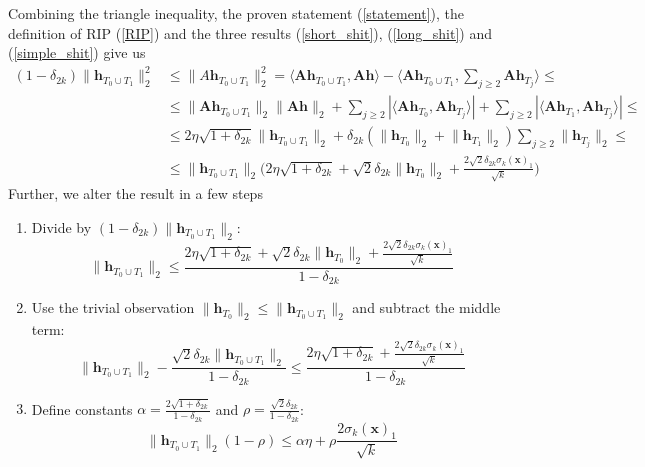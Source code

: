 \documentclass[11pt,oneside,czech,american]{book} %
\theoremstyle{definition} %
\theoremstyle{definition}
\begin{document}
Combining the triangle inequality, the proven statement (\ref{statement}), the definition of RIP (\ref{RIP}) and the three results (\ref{short_shit}), (\ref{long_shit}) and (\ref{simple_shit}) give us
\begin{equation}
	\begin{aligned}
	(1-\delta_{2k}) \lVert \bm{h}_{T_0 \cup T_1} \rVert^2_2 &\stackrel{ }{\leq} \lVert A \bm{h}_{T_0 \cup T_1} \rVert^2_2 = \langle \bm{A} \bm{h}_{T_0 \cup T_1}, \bm{A}\bm{h}\rangle - \langle \bm{A} \bm{h}_{T_0 \cup T_1}, \sum_{j\geq 2}\bm{A}\bm{h}_{T_j}\rangle \stackrel{ }{\leq} \\
	&\stackrel{ }{\leq} \lVert \bm{A} \bm{h}_{T_0 \cup T_1} \rVert_2 \lVert \bm{A} \bm{h} \rVert_2 + \sum_{j\geq 2} |\langle \bm{A} \bm{h}_{T_0}, \bm{A} \bm{h}_{T_j} \rangle | + \sum_{j\geq 2} |\langle \bm{A}\bm{h}_{T_1}, \bm{A} \bm{h}_{T_j} \rangle | \stackrel{ }{\leq} \\
	&\stackrel{ }{\leq} 2 \eta \sqrt{1+\delta_{2k}} \lVert \bm{h}_{T_0 \cup T_1} \rVert_2 + \delta_{2k}(\lVert \bm{h}_{T_0} \rVert_2 + \lVert \bm{h}_{T_1} \rVert_2) \sum_{j\geq 2} \lVert \bm{h}_{T_j} \rVert_2 \leq \\
	&\leq \lVert \bm{h}_{T_0 \cup T_1} \rVert_2 \Big( 2 \eta \sqrt{1+\delta_{2k}} + \sqrt{2} \delta_{2k} \lVert \bm{h}_{T_0} \rVert_2 + \frac{2 \sqrt{2} \delta_{2k}\sigma_k(\bm{x})_1}{\sqrt{k}} \Big) 
	\end{aligned}
\end{equation}
Further, we alter the result in a few steps
\begin{enumerate}
	\item Divide by $(1 - \delta_{2k}) \lVert \bm{h}_{T_0 \cup T_1} \rVert_2$:
\begin{equation}
	\lVert \bm{h}_{T_0 \cup T_1} \rVert_2 \leq \frac{2 \eta \sqrt{1+\delta_{2k}} + \sqrt{2} \delta_{2k} \lVert \bm{h}_{T_0} \rVert_2 + \frac{2 \sqrt{2} \delta_{2k}\sigma_k(\bm{x})_1}{\sqrt{k}}}{1 - \delta_{2k}}
\end{equation}
	\item Use the trivial observation $\lVert \bm{h}_{T_0} \rVert_2 \leq \lVert \bm{h}_{T_0 \cup T_1} \rVert_2$ and subtract the middle term:
	\begin{equation}
		\lVert \bm{h}_{T_0 \cup T_1} \rVert_2 - \frac{\sqrt{2} \delta_{2k} \lVert \bm{h}_{T_0 \cup T_1} \rVert_2}{1-\delta_{2k}}  \leq \frac{2 \eta \sqrt{1+\delta_{2k}} + \frac{2 \sqrt{2} \delta_{2k}\sigma_k(\bm{x})_1}{\sqrt{k}}}{1 - \delta_{2k}}
	\end{equation}
	\item Define constants $\alpha = \frac{2\sqrt{1+\delta_{2k}}}{1-\delta_{2k}}$ and $\rho = \frac{\sqrt{2}\delta_{2k}}{1-\delta_{2k}}$:
	\begin{equation}
		\lVert \bm{h}_{T_0 \cup T_1} \rVert_2 (1-\rho)\leq \alpha\eta + \rho \frac{2 \sigma_k(\bm{x})_1}{\sqrt{k}}
		\label{constanted}
	\end{equation}
\end{enumerate}
\end{document}
